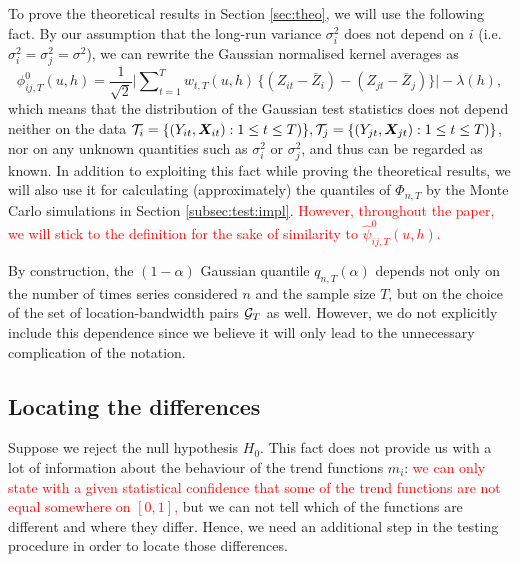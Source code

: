 \documentclass[a4paper,12pt]{article}
\makeatletter
\renewcommand{\eqref}[1]{\tagform@{\ref{#1}}}
\makeatother
\begin{document}
\begin{remark}
To prove the theoretical results in Section \ref{sec:theo}, we will use the following fact. By our assumption that the long-run variance $\sigma_i^2$ does not depend on $i$ \linebreak (i.e. $\sigma_i^2 = \sigma^2_j = \sigma^2$), we can rewrite the Gaussian normalised kernel averages \eqref{eq:phi_zero_ij} as
\[\phi^0_{ij, T}(u, h) = \frac{1}{\sqrt{2}} \Big|\sum\nolimits_{t=1}^T w_{t,T}(u, h) \, \big\{ (Z_{it} - \bar{Z}_i) - (Z_{jt} - \bar{Z}_j) \big\}\Big| - \lambda(h), \] 
which means that the distribution of the Gaussian test statistics does not depend neither on the data $\mathcal{T}_i =\{ (Y_{it}, \boldsymbol{X}_{it}) : 1\leq t \leq T)\}, \mathcal{T}_j =\{ (Y_{jt}, \boldsymbol{X}_{jt}) : 1\leq t \leq T)\}$, nor on any unknown quantities such as $\sigma^2_i$ or $\sigma_j^2$, and thus can be regarded as known. In addition to exploiting this fact while proving the theoretical results, we will also use it for calculating (approximately) the quantiles of $\Phi_{n, T}$ by the Monte Carlo simulations in Section \ref{subsec:test:impl}. \textcolor{red}{However, throughout the paper, we will stick to the definition \eqref{eq:phi_zero_ij} for the sake of similarity to $\hat{\psi}^0_{ij, T}(u, h)$.}%
\end{remark}

\begin{remark}
By construction, the $(1-\alpha)$ Gaussian quantile $q_{n, T}(\alpha)$ depends not only on the number of times series considered $n$ and the sample size $T$, but on the choice of the set of location-bandwidth pairs $\mathcal{G}_T$ as well. However, we do not explicitly include this dependence since we believe it will only lead to the unnecessary complication of the notation. 
\end{remark}

\subsection{Locating the differences}\label{subsec:test:loc}

Suppose we reject the null hypothesis $H_0$. This fact does not provide us with a lot of information about the behaviour of the trend functions $m_i$: \textcolor{red}{we can only state with a given statistical confidence that some of the trend functions are not equal somewhere on $[0, 1]$,} but we can not tell which of the functions are different and where they differ. Hence, we need an additional step in the testing procedure in order to locate those differences.
\end{document}
